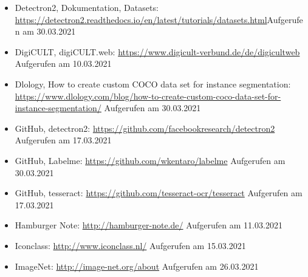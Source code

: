 \documentclass[a4paper,12pt,ngerman]{article}
\begin{document}
\begin{itemize}
\item Detectron2, Dokumentation, Datasets: \newline \href{https://detectron2.readthedocs.io/en/latest/tutorials/datasets.html}{https://detectron2.readthedocs.io/en/latest/tutorials/datasets.html}\newline Aufgerufen am 30.03.2021
\item DigiCULT, digiCULT.web: \newline \href{https://www.digicult-verbund.de/de/digicultweb}{https://www.digicult-verbund.de/de/digicultweb} \newline Aufgerufen am 10.03.2021
\item Dlology, How to create custom COCO data set for instance segmentation: \newline \href{https://www.dlology.com/blog/how-to-create-custom-coco-data-set-for-instance-segmentation/}{https://www.dlology.com/blog/how-to-create-custom-coco-data-set-for-instance-segmentation/} \newline Aufgerufen am 30.03.2021
\item GitHub, detectron2: \newline \href{https://github.com/facebookresearch/detectron2}{https://github.com/facebookresearch/detectron2} \newline Aufgerufen am 17.03.2021
\item GitHub, Labelme: \newline \href{https://github.com/wkentaro/labelme}{https://github.com/wkentaro/labelme} \newline Aufgerufen am 30.03.2021
\item GitHub, tesseract: \newline \href{https://github.com/tesseract-ocr/tesseract}{https://github.com/tesseract-ocr/tesseract} \newline Aufgerufen am 17.03.2021
\item Hamburger Note: \newline \href{http://hamburger-note.de/}{http://hamburger-note.de/} \newline Aufgerufen am 11.03.2021
\item Iconclass: \newline \href{http://www.iconclass.nl/}{http://www.iconclass.nl/} \newline Aufgerufen am 15.03.2021
\item ImageNet: \newline \href{http://image-net.org/about}{http://image-net.org/about} \newline Aufgerufen am 26.03.2021

\end{itemize}
\end{document}
